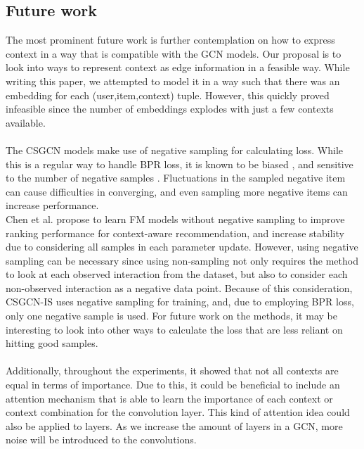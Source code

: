 
\subsection{Future work}
The most prominent future work is further contemplation on how to express context in a way that is compatible with the GCN models.
Our proposal is to look into ways to represent context as edge information in a feasible way.
While writing this paper, we attempted to model it in a way such that there was an embedding for each (user,item,context) tuple.
However, this quickly proved infeasible since the number of embeddings explodes with just a few contexts available.
\\\\
The CSGCN models make use of negative sampling for calculating loss.
While this is a regular way to handle BPR loss, it is known to be biased \cite{nonsampling,NegativeSampling}, and sensitive to the number of negative samples \cite{NCF}.
Fluctuations in the sampled negative item can cause difficulties in converging, and even sampling more negative items can increase performance.\\
Chen et al. \cite{nonsampling} propose to learn FM models without negative sampling to improve ranking performance for context-aware recommendation, and increase stability due to considering all samples in each parameter update.
However, using negative sampling can be necessary since using non-sampling not only requires the method to look at each observed interaction from the dataset, but also to consider each non-observed interaction as a negative data point.
Because of this consideration, CSGCN-IS uses negative sampling for training, and, due to employing BPR loss, only one negative sample is used.
For future work on the methods, it may be interesting to look into other ways to calculate the loss that are less reliant on hitting good samples.
\\\\
Additionally, throughout the experiments, it showed that not all contexts are equal in terms of importance.
Due to this, it could be beneficial to include an attention mechanism that is able to learn the importance of each context or context combination for the convolution layer.
This kind of attention idea could also be applied to layers.
As we increase the amount of layers in a GCN, more noise will be introduced to the convolutions.
